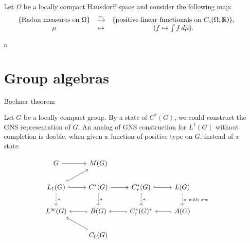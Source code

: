 \documentclass{../../large}
\begin{document}
\begin{prb}
Let $\Omega$ be a locally compact Hausdorff space and consider the following map:
\[\begin{array}{ccc}
\{\text{Radon measures on $\Omega$}\} & \xrightarrow{\sim} & \{\text{positive linear functionals on $C_c(\Omega,\mathbb{R})$}\},\\
\mu & \mapsto & (f\mapsto\int f\,d\mu).
\end{array}\]
\begin{parts}
\item a
\end{parts}
\end{prb}

\begin{prb}
\end{prb}




\section{Group algebras}
\begin{prb}
\end{prb}
\begin{prb}[Convolution]
\end{prb}
\begin{prb}
Bochner theorem
\end{prb}
\begin{prb}
\end{prb}
\begin{prb}
Let $G$ be a locally compact group.
By a state of $C^*(G)$, we could construct the GNS representation of $G$.
An analog of GNS construction for $L^1(G)$ without completion is doable, when given a function of positive type on $G$, instead of a state.
\end{prb}


\[\begin{tikzcd}
G \ar{r} & M(G) & \, & \,\\
L_1(G) \ar[hook]{ur}\ar[hook]{r}\ar[dashed]{d}{*} & C^*(G) \ar[two heads]{r}\ar[dashed]{d}{*} & C_r^*(G) \ar[hook]{r}\ar[dashed]{d}{*} & L(G) \ar[dashed]{d}{*\text{ with }\sigma w}\\
L^\infty(G) & B(G) \ar[hook]{l} & C_r^*(G)^* \ar[hook]{l} & A(G) \ar[hook]{l}\\
& C_0(G) \ar[hook]{ul} & &
\end{tikzcd}\]
\end{document}
